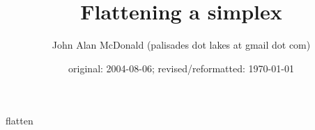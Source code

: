 \documentclass{PalisadesLakesArticle}
\title{Flattening a simplex}
\author{John Alan McDonald (palisades dot lakes at gmail dot com)}
\date{original: 2004-08-06; revised/reformatted: \today}
\begin{document}
\maketitle
\def\sharedFolder{../../shared/}
{flatten}
\end{document}

